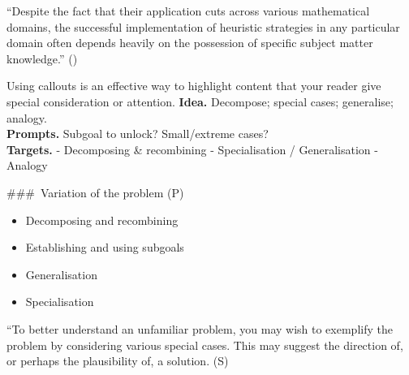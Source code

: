 \documentclass[
  a4paper,
  DIV=11,
  numbers=noendperiod,
  oneside]{scrreprt}
\providecommand{\tightlist}{%
  \setlength{\itemsep}{0pt}\setlength{\parskip}{0pt}}
\begin{document}
\begin{tcolorbox}[enhanced jigsaw, leftrule=.75mm, breakable, coltitle=black, titlerule=0mm, bottomtitle=1mm, arc=.35mm, rightrule=.15mm, opacitybacktitle=0.6, toptitle=1mm, toprule=.15mm, left=2mm, colframe=quarto-callout-warning-color-frame, title=\textcolor{quarto-callout-warning-color}{\faExclamationTriangle}\hspace{0.5em}{Heuristics will not replace shaky mastery of a subject!}, colback=white, colbacktitle=quarto-callout-warning-color!10!white, bottomrule=.15mm, opacityback=0]

``Despite the fact that their application cuts across various
mathematical domains, the successful implementation of heuristic
strategies in any particular domain often depends heavily on the
possession of specific subject matter knowledge.''
()

\end{tcolorbox}

\begin{tcolorbox}[enhanced jigsaw, leftrule=.75mm, breakable, coltitle=black, titlerule=0mm, bottomtitle=1mm, arc=.35mm, rightrule=.15mm, opacitybacktitle=0.6, toptitle=1mm, toprule=.15mm, left=2mm, colframe=quarto-callout-note-color-frame, title={Variation of the problem (P)}, colback=white, colbacktitle=quarto-callout-note-color!10!white, bottomrule=.15mm, opacityback=0]

Using callouts is an effective way to highlight content that your reader
give special consideration or attention. \textbf{Idea.} Decompose;
special cases; generalise; analogy.\\
\textbf{Prompts.} Subgoal to unlock? Small/extreme cases?\\
\textbf{Targets.} - Decomposing \& recombining - Specialisation /
Generalisation - Analogy

\end{tcolorbox}

\#\#\#~Variation of the problem (P)

\begin{itemize}
\tightlist
\item
  Decomposing and recombining
\item
  Establishing and using subgoals
\item
  Generalisation
\item
  Specialisation
\end{itemize}

``To better understand an unfamiliar problem, you may wish to exemplify
the problem by considering various special cases. This may suggest the
direction of, or perhaps the plausibility of, a solution.\textbar{} (S)
\end{document}
